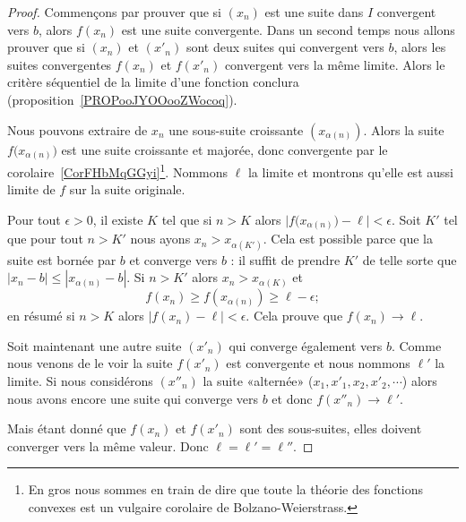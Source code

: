 \begin{proof}
    Commençons par prouver que si \( (x_n)\) est une suite dans \( I\) convergent vers \( b\), alors \( f(x_n)\) est une suite convergente. Dans un second temps nous allons prouver que si \( (x_n)\) et \( (x'_n)\) sont deux suites qui convergent vers \( b\), alors les suites convergentes \( f(x_n)\) et \( f(x'_n)\) convergent vers la même limite. Alors le critère séquentiel de la limite d'une fonction conclura (proposition~\ref{PROPooJYOOooZWocoq}).

    Nous pouvons extraire de \( x_n\) une sous-suite croissante \( (x_{\alpha(n)})\). Alors la suite \( f\big( x_{\alpha(n)} \big)\) est une suite croissante et majorée, donc convergente par le corolaire~\ref{CorFHbMqGGyi}\footnote{En gros nous sommes en train de dire que toute la théorie des fonctions convexes est un vulgaire corolaire de Bolzano-Weierstrass.}. Nommons \( \ell\) la limite et montrons qu'elle est aussi limite de \( f\) sur la suite originale.

    Pour tout \( \epsilon>0\), il existe \( K\) tel que si \( n>K\) alors \( \big| f\big( x_{\alpha(n)} \big)-\ell \big|<\epsilon\). Soit \( K'\) tel que pour tout \( n>K'\) nous ayons \( x_n>x_{\alpha(K')}\). Cela est possible parce que la suite est bornée par \( b\) et converge vers \( b\) : il suffit de prendre \( K'\) de telle sorte que \( | x_n-b |\leq | x_{\alpha(n)}-b |\). Si \( n>K'\) alors \( x_n>x_{\alpha(K)}\) et
    \begin{equation}
        f(x_n)\geq f(x_{\alpha(n)})\geq \ell-\epsilon;
    \end{equation}
    en résumé si \( n>K\) alors \( | f(x_n)-\ell |<\epsilon\). Cela prouve que \( f(x_n)\to\ell\).

    Soit maintenant une autre suite \( (x'_n)\) qui converge également vers \( b\). Comme nous venons de le voir la suite \( f(x'_n)\) est convergente et nous nommons \( \ell'\) la limite. Si nous considérons \( (x''_n)\) la suite «alternée» (\( x_1,x'_1,x_2,x'_2,\cdots\)) alors nous avons encore une suite qui converge vers \( b\) et donc \( f(x''_n)\to \ell'\).

    Mais étant donné que \( f(x_n)\) et \( f(x'_n)\) sont des sous-suites, elles doivent converger vers la même valeur. Donc \( \ell=\ell'=\ell''\).
\end{proof}


